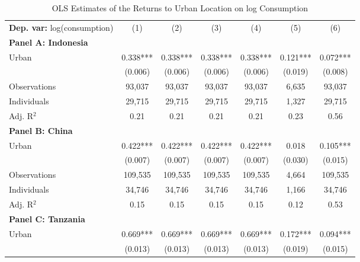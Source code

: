 \begin{table}[htbp] \centering \begin{threeparttable}
 \caption{OLS Estimates of the Returns to Urban Location on log Consumption} 
 \label{tab:OLS_cons_urb_unb} 
\begin{tabular}{l cccccc} \toprule  \textbf{Dep. var:}  log(consumption) 
                    &\multicolumn{1}{c}{(1)}   &\multicolumn{1}{c}{(2)}   &\multicolumn{1}{c}{(3)}   &\multicolumn{1}{c}{(4)}   &\multicolumn{1}{c}{(5)}   &\multicolumn{1}{c}{(6)}   \\
\textbf{Panel A: Indonesia} \\
Urban               &       0.338***&       0.338***&       0.338***&       0.338***&       0.121***&       0.072***\\
                    &     (0.006)   &     (0.006)   &     (0.006)   &     (0.006)   &     (0.019)   &     (0.008)   \\
\addlinespace
Observations        &      93,037   &      93,037   &      93,037   &      93,037   &       6,635   &      93,037   \\
Individuals         &      29,715   &      29,715   &      29,715   &      29,715   &       1,327   &      29,715   \\
Adj. R$^{2}$        &        0.21   &        0.21   &        0.21   &        0.21   &        0.23   &        0.56   \\
\cmidrule{2 -7}
\textbf{Panel B: China} \\
Urban               &       0.422***&       0.422***&       0.422***&       0.422***&       0.018   &       0.105***\\
                    &     (0.007)   &     (0.007)   &     (0.007)   &     (0.007)   &     (0.030)   &     (0.015)   \\
\addlinespace
Observations        &     109,535   &     109,535   &     109,535   &     109,535   &       4,664   &     109,535   \\
Individuals         &      34,746   &      34,746   &      34,746   &      34,746   &       1,166   &      34,746   \\
Adj. R$^{2}$        &        0.15   &        0.15   &        0.15   &        0.15   &        0.12   &        0.53   \\
\cmidrule{2-7}
\textbf{Panel C: Tanzania} \\
Urban               &       0.669***&       0.669***&       0.669***&       0.669***&       0.172***&       0.094***\\
                    &     (0.013)   &     (0.013)   &     (0.013)   &     (0.013)   &     (0.019)   &     (0.015)   \\

\end{tabular}
\end{threeparttable}
\end{table}
